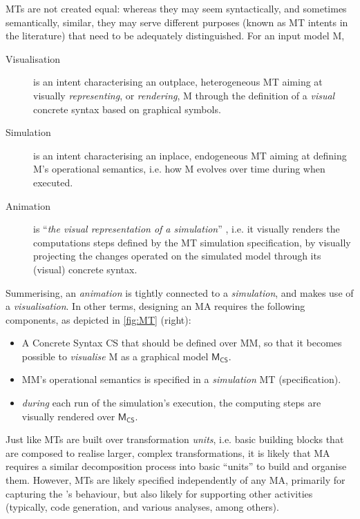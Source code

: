 MTs are not created equal: whereas they may seem syntactically, and sometimes 
semantically, similar, they may serve different purposes (known as MT intents
\citep{J:Lucio-Amrani-etAl:2014} in the literature) that need to be adequately
distinguished. For an input model \textsf{M},
\begin{description}
   \item[Visualisation] is an intent characterising an outplace, heterogeneous
   MT aiming at visually \emph{representing}, or \emph{rendering}, \textsf{M} 
   through the definition of a \emph{visual} concrete syntax based on graphical 
   symbols.
   
   \item[Simulation] is an intent characterising an inplace, endogeneous MT aiming
   at defining \textsf{M}'s operational semantics, i.e. how \textsf{M} evolves 
   over time during when executed.
   
   \item[Animation] is ``\emph{the visual representation of a simulation}'' 
   \citep{J:Lucio-Amrani-etAl:2014}, i.e. it visually renders the computations steps
   defined by the MT simulation specification, by visually projecting the changes
   operated on the simulated model through its (visual) concrete syntax.
\end{description}
Summerising, an \emph{animation} is tightly connected to a \emph{simulation}, and
makes use of a \emph{visualisation}. In other terms, designing an MA requires the
following components, as depicted in \autoref{fig:MT} (right):
\begin{itemize}
	\item A Concrete Syntax \textsf{CS} that should be defined over \textsf{MM}, so
   that it becomes possible to \emph{visualise} \textsf{M} as a graphical model 
   $\mathsf{M}_{\mathsf{CS}}$.
   
   \item \textsf{MM}'s operational semantics is specified in a \emph{simulation}
   MT (specification).
   
   \item \emph{during} each run of the simulation's execution, the computing steps
   are visually rendered over $\mathsf{M}_{\mathsf{CS}}$.
\end{itemize}

Just like MTs are built over transformation \emph{units}, i.e. basic building blocks
that are composed to realise larger, complex transformations, it is likely that 
MA requires a similar decomposition process into basic ``units'' to build and 
organise them. However, MTs are likely specified independently of any MA, primarily
for capturing the \DSL's behaviour, but also likely for supporting other activities
(typically, code generation, and various analyses, among others).

